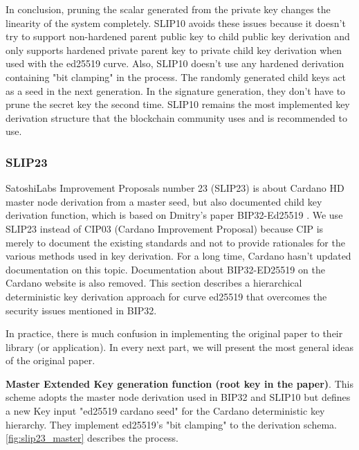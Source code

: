 \begin{adjustwidth}{1cm}{}
\begin{itemize}
\begin{quote}
              \end{quote}

    \end{itemize}
    In conclusion, pruning the scalar generated from the private key changes the linearity of the system completely. SLIP10 avoids these issues because it doesn't try to support non-hardened parent public key to child public key derivation and only supports hardened private parent key to private child key derivation when used with the ed25519 curve. Also, SLIP10 doesn't use any hardened derivation containing "bit clamping" in the process. The randomly generated child keys act as a seed in the next generation. In the signature generation, they don't have to prune the secret key the second time. SLIP10 remains the most implemented key derivation structure that the blockchain community uses and is recommended to use.

\end{adjustwidth}


\subsubsection{SLIP23}
\label{bip32ed25519}

SatoshiLabs Improvement Proposals number 23 (SLIP23) is about Cardano HD master node derivation from a master seed, but also documented child key derivation function, which is based on Dmitry’s paper BIP32-Ed25519 \cite{Khovratovich2017}. We use SLIP23 instead of CIP03 (Cardano Improvement Proposal) because CIP is merely to document the existing standards and not to provide rationales for the various methods used in key derivation. For a long time, Cardano hasn’t updated documentation on this topic. Documentation about BIP32-ED25519 on the Cardano website is also removed. This section describes a hierarchical deterministic key derivation approach for curve ed25519 that overcomes the security issues mentioned in BIP32.

In practice, there is much confusion in implementing the original paper to their library (or application). In every next part, we will present the most general ideas of the original paper.

\bigskip
{\textbf{Master Extended Key generation function (root key in the paper)}}. This scheme adopts the master node derivation used in BIP32 and SLIP10 but defines a new Key input "ed25519 cardano seed" for the Cardano deterministic key hierarchy. They implement ed25519's "bit clamping" to the derivation schema.
\autoref{fig:slip23_master} describes the process.

